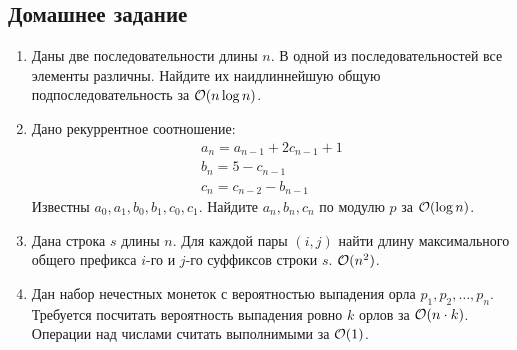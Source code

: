 

\subsection{Домашнее задание}

\begin{enumerate}

  \item {}
    Даны две последовательности длины $n$. В одной из последовательностей все элементы различны. Найдите
    их наидлиннейшую общую подпоследовательность за $\mathcal{O}(n \log n)$. 

  \item {} Дано рекуррентное соотношение:
    $$\begin{matrix}
    a_n = a_{n - 1} + 2c_{n - 1} + 1 \\
    b_n = 5 - c_{n - 1} \\
    c_n = c_{n - 2} - b_{n - 1}
    \end{matrix}$$
    Известны $a_0, a_1, b_0, b_1, c_0, c_1$.
    Найдите $a_n, b_n, c_n$ по модулю $p$ за $\mathcal{O}(\log n)$.
    
  \item
    Дана строка $s$ длины $n$. Для каждой пары $(i, j)$ найти длину максимального
    общего префикса $i$-го и $j$-го суффиксов строки $s$. $\mathcal{O}(n^2)$.

  \item
    Дан набор нечестных монеток с вероятностью выпадения орла
    $p_1, p_2, \dots, p_n$. Требуется посчитать вероятность выпадения
    ровно $k$ орлов за $\mathcal{O}(n \cdot k)$. Операции над числами считать 
    выполнимыми за $\mathcal{O}(1)$.



\end{enumerate}
